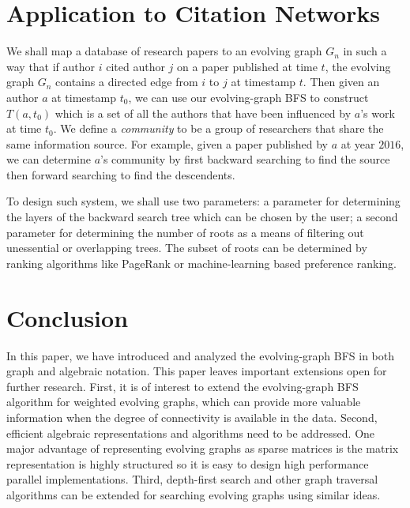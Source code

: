 \documentclass[11pt, conference, , compsocconf]{IEEEtran}
\theoremstyle{definition}
\begin{document}
\section{Application to Citation Networks}
\label{sec:applications}

We shall map a database of research papers to an evolving graph $G_n$
in such a way that if author $i$ cited author $j$ on a paper published
at  time $t$, the evolving graph $G_n$ contains a directed edge from
$i$ to $j$ at timestamp $t$. Then given an author $a$ at timestamp $t_0$,
we can use our evolving-graph BFS to construct $T(a, t_0)$ which is 
a set of all the authors that have been influenced by $a$'s work at  
time $t_0$. We define a \emph{community} to be a group of 
researchers that share the same information source. 
For example, given a paper published by $a$ at year $2016$, 
we can determine $a$'s community by first backward searching to 
find the source then forward searching to find the descendents.

To design such system, we shall use two parameters: 
 a parameter for 
determining the layers of the backward search tree which can be chosen by the user;
a second parameter for determining the number of roots as a means of 
filtering out unessential or overlapping trees. The subset of roots can be determined
by ranking algorithms like PageRank or machine-learning based preference ranking. 


\section{Conclusion}

In this paper, we have introduced and analyzed the evolving-graph BFS in both 
graph and algebraic notation. 
This paper leaves important extensions open for further research. First, it is 
of interest to extend the evolving-graph BFS algorithm for weighted evolving graphs, which can provide more valuable information when the degree of connectivity is available in the data. 
Second, efficient algebraic representations and algorithms need to be addressed. 
One major advantage of representing evolving graphs as sparse matrices
is the matrix representation is highly structured so it is easy to design
high performance parallel implementations. 
Third, depth-first search and other graph traversal algorithms can be 
extended for searching evolving graphs using similar ideas. 


\end{document}
